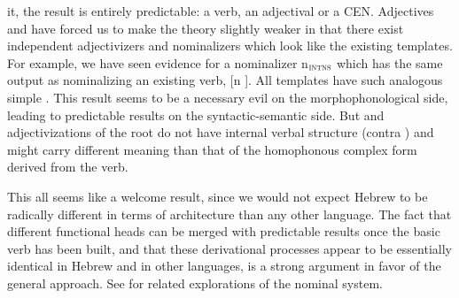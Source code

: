 \begin{exe}
\begin{xlist}
\begin{exe}
\begin{xlist}
\begin{exe}
\begin{exe}
\begin{xlist}
\begin{exe}
\begin{exe}
\begin{xlist}
\begin{exe}
\begin{xlist}
\begin{exe}
\begin{xlist}
\begin{exe}
\begin{xlist}
\begin{exe}
\begin{xlist}
\begin{xlist}
\begin{exe}
\begin{xlist}
\begin{exe}
\begin{xlist}
\begin{exe}
\begin{exe}
\begin{exe}
\begin{xlist}
\begin{exe}
\begin{exe}
\begin{xlist}
\begin{exe}
\begin{xlist}
\begin{exe}
\begin{xlist}
\begin{exe}
\begin{xlist}
\begin{xlist}
\begin{exe}
\begin{xlist}
\begin{exe}
\begin{xlist}
\begin{exe}
\begin{xlist}
\begin{exe}
\begin{xlist}
\begin{exe}
\begin{exe}
\begin{exe}
\begin{exe}
\begin{exe}
\begin{xlist}
\begin{xlist}
\begin{exe}
\begin{xlist}
\begin{exe}
\begin{xlist}
\begin{exe}
\begin{exe}
\begin{exe}
\begin{xlist}
\begin{exe}
\begin{xlist}
\begin{exe}
\begin{xlist}
\begin{exe}
\begin{exe}
\begin{xlist}
\begin{exe}
\begin{exe}
\begin{exe}
\begin{xlist}
\begin{xlist}
\begin{exe}
\begin{exe}
\begin{exe}
\begin{xlist}
\begin{exe}
\begin{xlist}
it, the result is entirely predictable: a  verb, an adjectival  or a CEN. Adjectives and  have forced us to make the theory slightly weaker in that there exist independent adjectivizers and nominalizers which look like the existing templates. For example, we have seen evidence for a nominalizer n$_{\gsc{INTNS}}$ which has the same output as nominalizing an existing verb, [n \tpie]. All templates have such analogous simple . This result seems to be a necessary evil on the morphophonological side, leading to predictable results on the syntactic-semantic side. But  and adjectivizations of the root do not have internal verbal structure (contra \citealt{borer13oup,borer14lingua}) and might carry different meaning than that of the homophonous complex form derived from the verb.

This all seems like a welcome result, since we would not expect Hebrew to be radically different in terms of architecture than any other language. The fact that different functional heads can be merged with predictable results once the basic verb has been built, and that these derivational processes appear to be essentially identical in Hebrew and in other languages, is a strong argument in favor of the general approach. See \cite{ahdout19phd} for related explorations of the nominal system.\label{r1:5:7}


\end{xlist}
\end{exe}
\end{xlist}
\end{exe}
\end{exe}
\end{exe}
\end{xlist}
\end{xlist}
\end{exe}
\end{exe}
\end{exe}
\end{xlist}
\end{exe}
\end{exe}
\end{xlist}
\end{exe}
\end{xlist}
\end{exe}
\end{xlist}
\end{exe}
\end{exe}
\end{exe}
\end{xlist}
\end{exe}
\end{xlist}
\end{exe}
\end{xlist}
\end{xlist}
\end{exe}
\end{exe}
\end{exe}
\end{exe}
\end{exe}
\end{xlist}
\end{exe}
\end{xlist}
\end{exe}
\end{xlist}
\end{exe}
\end{xlist}
\end{exe}
\end{xlist}
\end{xlist}
\end{exe}
\end{xlist}
\end{exe}
\end{xlist}
\end{exe}
\end{xlist}
\end{exe}
\end{exe}
\end{xlist}
\end{exe}
\end{exe}
\end{exe}
\end{xlist}
\end{exe}
\end{xlist}
\end{exe}
\end{xlist}
\end{xlist}
\end{exe}
\end{xlist}
\end{exe}
\end{xlist}
\end{exe}
\end{xlist}
\end{exe}
\end{xlist}
\end{exe}
\end{exe}
\end{xlist}
\end{exe}
\end{exe}
\end{xlist}
\end{exe}
\end{xlist}
\end{exe}
